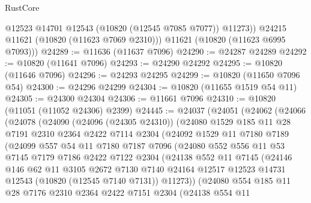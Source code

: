 \begin{lexlean}{RustCore}
\begin{coremodule}
            @12523
            @14701
            @12543
            (@10820 (@12545 @7085 @7077))
            @11273))
        @24215
        @11621
        (@10820 (@11623 @7069 @2310)))
      @11621
      (@10820 (@11623 @6995 @7093)))
@24289 := @11636 (@11637 @7096)
@24290 := @24287 @24289
@24292 := @10820 (@11641 @7096)
@24293 := @24290 @24292
@24295 := @10820 (@11646 @7096)
@24296 := @24293 @24295
@24299 := @10820 (@11650 @7096 @54)
@24300 := @24296 @24299
@24304 := @10820 (@11655 @1519 @54 @11)
@24305 := @24300 @24304
@24306 := @11661 @7096
@24310 := @10820 (@11051 (@11052 @24306) @2399)
@24445 := @24037
    (@24051
      (@24062
        (@24066
          (@24078
            (@24090
              (@24096 (@24305 @24310))
              (@24080
                @1529
                @185
                @11
                @28
                @7191
                @2310
                @2364
                @2422
                @7114
                @2304
                (@24092
                  @1529
                  @11
                  @7180
                  @7189
                  (@24099
                    @557
                    @54
                    @11
                    @7180
                    @7187
                    @7096
                    (@24080
                      @552
                      @556
                      @11
                      @53
                      @7145
                      @7179
                      @7186
                      @2422
                      @7122
                      @2304
                      (@24138
                        @552
                        @11
                        @7145
                        (@24146
                          @146
                          @62
                          @11
                          @3105
                          @2672
                          @7130
                          @7140
                          @24164
                          @12517
                          @12523
                          @14731
                          @12543
                          (@10820 (@12545 @7140 @7131))
                          @11273))
                      (@24080
                        @554
                        @185
                        @11
                        @28
                        @7176
                        @2310
                        @2364
                        @2422
                        @7151
                        @2304
                        (@24138
                          @554
                          @11

\end{coremodule}
\end{lexlean}
